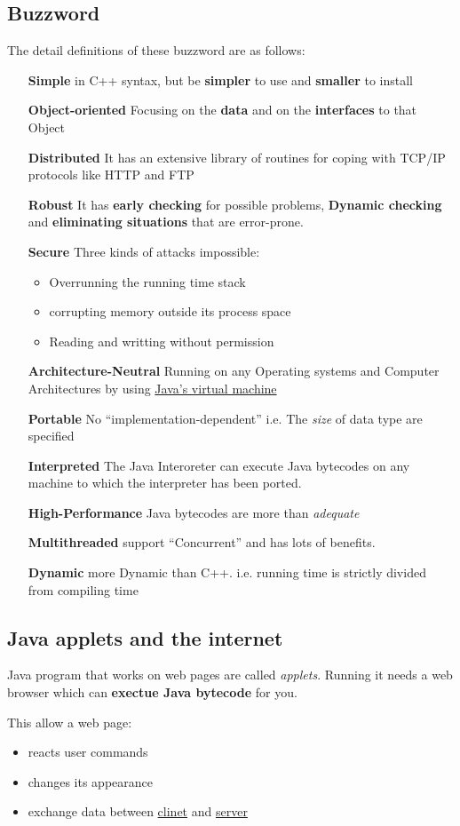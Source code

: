 \documentclass[12pt]{article}
\begin{document}
\subsection{Buzzword}
The detail definitions of these buzzword are as follows:
\begin{enumerate}
    \item[\textbf{Simple}] in C++ syntax, but be \textbf{simpler} to use 
    and \textbf{smaller} to install
    \item[\textbf{Object-oriented}] Focusing on the \textbf{data} and on the \textbf{interfaces} to that Object
    \item[\textbf{Distributed}] It has an extensive library of routines for coping with TCP/IP protocols like HTTP and FTP
    \item[\textbf{Robust}] It has \textbf{early checking} for possible problems, \textbf{Dynamic checking}
    and \textbf{eliminating situations} that are error-prone.
    \item[\textbf{Secure}] Three kinds of attacks impossible:
        \begin{itemize}
            \item Overrunning the running time stack
            \item corrupting memory outside its process space
            \item Reading and writting without permission
        \end{itemize}
    \item[\textbf{Architecture-Neutral}] Running on any Operating systems and Computer Architectures
    by using \underline{Java's virtual machine} 
    \item[\textbf{Portable}] No ``implementation-dependent'' i.e. The \textit{size} of data type are specified
    \item[\textbf{Interpreted}] The Java Interoreter can execute Java bytecodes on any machine to which the interpreter has been ported.
    \item[\textbf{High-Performance}] Java bytecodes are more than \textit{adequate}
    \item[\textbf{Multithreaded}] support ``Concurrent'' and has lots of benefits.
    \item[\textbf{Dynamic}] more Dynamic than C++. i.e. running time is strictly divided from compiling time    
\end{enumerate}

\subsection{Java applets and the internet}
Java program that works on web pages are called \emph{applets}. Running it needs a web browser
which can \textbf{exectue Java bytecode} for you.

This allow a web page:
\begin{itemize}
    \item reacts user commands
    \item changes its appearance
    \item exchange data between \underline{clinet} and \underline{server}
\end{itemize}
\end{document}

